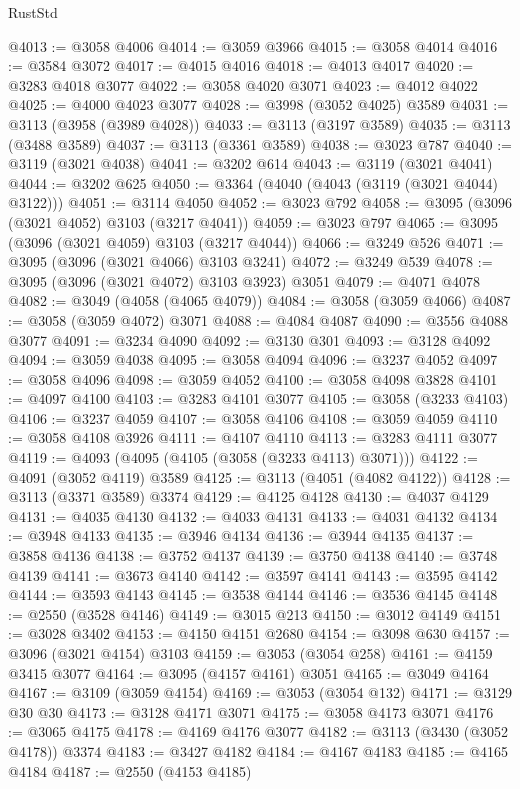 \begin{lexlean}{RustStd}
\begin{coremodule}
@4013 := @3058 @4006
@4014 := @3059 @3966
@4015 := @3058 @4014
@4016 := @3584 @3072
@4017 := @4015 @4016
@4018 := @4013 @4017
@4020 := @3283 @4018 @3077
@4022 := @3058 @4020 @3071
@4023 := @4012 @4022
@4025 := @4000 @4023 @3077
@4028 := @3998 (@3052 @4025) @3589
@4031 := @3113 (@3958 (@3989 @4028))
@4033 := @3113 (@3197 @3589)
@4035 := @3113 (@3488 @3589)
@4037 := @3113 (@3361 @3589)
@4038 := @3023 @787
@4040 := @3119 (@3021 @4038)
@4041 := @3202 @614
@4043 := @3119 (@3021 @4041)
@4044 := @3202 @625
@4050 := @3364 (@4040 (@4043 (@3119 (@3021 @4044) @3122)))
@4051 := @3114 @4050
@4052 := @3023 @792
@4058 := @3095 (@3096 (@3021 @4052) @3103 (@3217 @4041))
@4059 := @3023 @797
@4065 := @3095 (@3096 (@3021 @4059) @3103 (@3217 @4044))
@4066 := @3249 @526
@4071 := @3095 (@3096 (@3021 @4066) @3103 @3241)
@4072 := @3249 @539
@4078 := @3095 (@3096 (@3021 @4072) @3103 @3923) @3051
@4079 := @4071 @4078
@4082 := @3049 (@4058 (@4065 @4079))
@4084 := @3058 (@3059 @4066)
@4087 := @3058 (@3059 @4072) @3071
@4088 := @4084 @4087
@4090 := @3556 @4088 @3077
@4091 := @3234 @4090
@4092 := @3130 @301
@4093 := @3128 @4092
@4094 := @3059 @4038
@4095 := @3058 @4094
@4096 := @3237 @4052
@4097 := @3058 @4096
@4098 := @3059 @4052
@4100 := @3058 @4098 @3828
@4101 := @4097 @4100
@4103 := @3283 @4101 @3077
@4105 := @3058 (@3233 @4103)
@4106 := @3237 @4059
@4107 := @3058 @4106
@4108 := @3059 @4059
@4110 := @3058 @4108 @3926
@4111 := @4107 @4110
@4113 := @3283 @4111 @3077
@4119 := @4093 (@4095 (@4105 (@3058 (@3233 @4113) @3071)))
@4122 := @4091 (@3052 @4119) @3589
@4125 := @3113 (@4051 (@4082 @4122))
@4128 := @3113 (@3371 @3589) @3374
@4129 := @4125 @4128
@4130 := @4037 @4129
@4131 := @4035 @4130
@4132 := @4033 @4131
@4133 := @4031 @4132
@4134 := @3948 @4133
@4135 := @3946 @4134
@4136 := @3944 @4135
@4137 := @3858 @4136
@4138 := @3752 @4137
@4139 := @3750 @4138
@4140 := @3748 @4139
@4141 := @3673 @4140
@4142 := @3597 @4141
@4143 := @3595 @4142
@4144 := @3593 @4143
@4145 := @3538 @4144
@4146 := @3536 @4145
@4148 := @2550 (@3528 @4146)
@4149 := @3015 @213
@4150 := @3012 @4149
@4151 := @3028 @3402
@4153 := @4150 @4151 @2680
@4154 := @3098 @630
@4157 := @3096 (@3021 @4154) @3103
@4159 := @3053 (@3054 @258)
@4161 := @4159 @3415 @3077
@4164 := @3095 (@4157 @4161) @3051
@4165 := @3049 @4164
@4167 := @3109 (@3059 @4154)
@4169 := @3053 (@3054 @132)
@4171 := @3129 @30 @30
@4173 := @3128 @4171 @3071
@4175 := @3058 @4173 @3071
@4176 := @3065 @4175
@4178 := @4169 @4176 @3077
@4182 := @3113 (@3430 (@3052 @4178)) @3374
@4183 := @3427 @4182
@4184 := @4167 @4183
@4185 := @4165 @4184
@4187 := @2550 (@4153 @4185)

\end{coremodule}
\end{lexlean}
